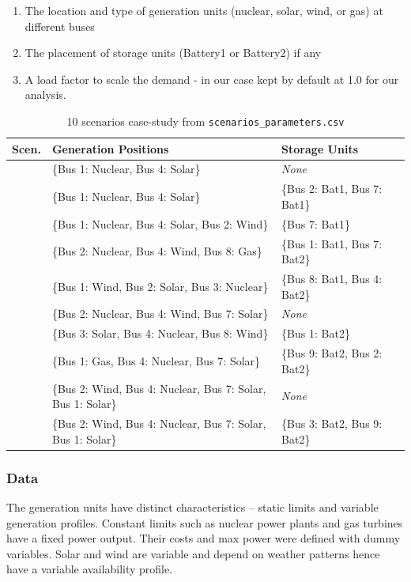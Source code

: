 \begin{enumerate}
    \item The location and type of generation units (nuclear, solar, wind, or gas) at different buses
    \item The placement of storage units (Battery1 or Battery2) if any
    \item A load factor to scale the demand - in our case kept by default at 1.0 for our analysis.
\end{enumerate}

\begin{table}[H]
\centering
\begin{tabular}{l l l l}
\hline
\textbf{Scen.} & \textbf{Generation Positions} & \textbf{Storage Units} \\
\hline
\centering{1} & \{Bus 1: Nuclear, Bus 4: Solar\} & \textit{None} \\
\centering{2} & \{Bus 1: Nuclear, Bus 4: Solar\} & \{Bus 2: Bat1, Bus 7: Bat1\} \\
\centering{3} & \{Bus 1: Nuclear, Bus 4: Solar, Bus 2: Wind\} & \{Bus 7: Bat1\} \\
\centering{4} & \{Bus 2: Nuclear, Bus 4: Wind, Bus 8: Gas\} & \{Bus 1: Bat1, Bus 7: Bat2\} \\
\centering{5} & \{Bus 1: Wind, Bus 2: Solar, Bus 3: Nuclear\} & \{Bus 8: Bat1, Bus 4: Bat2\} \\
\centering{6} & \{Bus 2: Nuclear, Bus 4: Wind, Bus 7: Solar\} & \textit{None} \\
\centering{7} & \{Bus 3: Solar, Bus 4: Nuclear, Bus 8: Wind\} & \{Bus 1: Bat2\} \\
\centering{8} & \{Bus 1: Gas, Bus 4: Nuclear, Bus 7: Solar\} & \{Bus 9: Bat2, Bus 2: Bat2\} \\
\centering{9} & \{Bus 2: Wind, Bus 4: Nuclear, Bus 7: Solar, Bus 1: Solar\} & \textit{None} \\
\centering{10} & \{Bus 2: Wind, Bus 4: Nuclear, Bus 7: Solar, Bus 1: Solar\} & \{Bus 3: Bat2, Bus 9: Bat2\} \\
\hline
\end{tabular}
\caption{10 scenarios case-study from \texttt{scenarios\_parameters.csv}}
\label{tab:scenario_definitions}
\end{table}


\subsubsection{Data}
The generation units have distinct characteristics -- static limits and variable generation profiles.
Constant limits such as nuclear power plants and gas turbines have a fixed power output. Their costs and max
power were defined with dummy variables. Solar and wind are variable and depend on weather patterns hence have
a variable availability profile.

